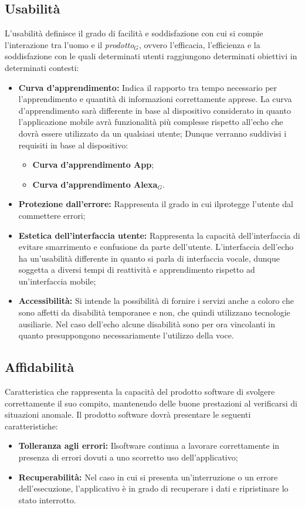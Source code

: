 \subsection{Usabilità}
L'usabilità definisce il grado di facilità e soddisfazione con cui si compie l'interazione tra l'uomo e il \textit{prodotto$_{G}$}, ovvero l'efficacia, l'efficienza e la soddisfazione con le quali determinati utenti raggiungono determinati obiettivi in determinati contesti:
\begin{itemize}
	\item \textbf{Curva d'apprendimento:} Indica il rapporto tra tempo necessario per l'apprendimento e quantità di informazioni correttamente apprese.
	La curva d'apprendimento sarà differente in base al dispositivo considerato in quanto l'applicazione mobile avrà funzionalità più complesse rispetto all'echo che dovrà essere utilizzato da un qualsiasi utente; Dunque verranno suddivisi i requisiti in base al dispositivo:
	\begin{itemize}
		\item \textbf{Curva d'apprendimento App};
		\item \textbf{Curva d'apprendimento Alexa$_{G}$}.
	\end{itemize}
	\item \textbf{Protezione dall'errore:} Rappresenta il grado in cui ilprotegge l'utente dal commettere errori;
	\item \textbf{Estetica dell'interfaccia utente:} Rappresenta la capacità dell'interfaccia di evitare smarrimento e confusione da parte dell'utente.
	L'interfaccia dell'echo ha un'usabilità differente in quanto si parla di interfaccia vocale, dunque soggetta a diversi tempi di reattività e apprendimento rispetto ad un'interfaccia mobile;
	\item \textbf{Accessibilità:} Si intende la possibilità di fornire i servizi anche a coloro che sono affetti da disabilità temporanee e non, che quindi utilizzano tecnologie ausiliarie.
	Nel caso dell'echo alcune disabilità sono per ora vincolanti in quanto presuppongono necessariamente l'utilizzo della voce.
\end{itemize}
\subsection{Affidabilità}
Caratteristica che rappresenta la capacità del prodotto software di svolgere correttamente il suo compito, mantenendo delle buone prestazioni al verificarsi di situazioni anomale.
Il prodotto software dovrà presentare le seguenti caratteristiche:
\begin{itemize}
	\item \textbf{Tolleranza agli errori:} Ilsoftware continua a lavorare correttamente in presenza di errori dovuti a uno scorretto uso dell'applicativo;
	\item \textbf{Recuperabilità:} Nel caso in cui si presenta un'interruzione  o un errore dell'esecuzione, l'applicativo è in grado di recuperare i dati e ripristinare lo stato interrotto.
\end{itemize}
